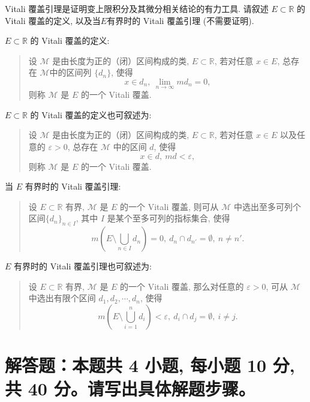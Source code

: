 \begin{question}[points = 10]
  Vitali 覆盖引理是证明变上限积分及其微分相关结论的有力工具. 请叙述 $E\subset \mathbb{R}$ 的 Vitali 覆盖的定义, 以及当$E$有界时的 Vitali 覆盖引理 (不需要证明).
\end{question}

\begin{solution}
  \(E\subset \mathbb{R}\) 的 Vitali 覆盖的定义: 

  \begin{quote}
  设 \(\mathscr{M}\) 是由长度为正的（闭）区间构成的类, \(E \subset \mathbb{R}\), 若对任意 \(x \in E\), 总存在 \(\mathscr{M}\)中的区间列 \(\{d_n\}\), 使得
  \[x \in d_n, ~ \lim\limits_{n\to\infty} m d_n = 0,\]
  则称 \(\mathscr{M}\) 是 \(E\) 的一个 Vitali 覆盖.
  \end{quote}

  \(E\subset \mathbb{R}\) 的 Vitali 覆盖的定义也可叙述为:

  \begin{quote}
  设 \(\mathscr{M}\) 是由长度为正的（闭）区间构成的类, \(E \subset \mathbb{R}\), 若对任意 \(x \in E\) 以及任意的 \(\varepsilon > 0\), 总存在 \(\mathscr{M}\) 中的区间 \(d\), 使得
  \[x \in d, ~ m d < \varepsilon,\]
  则称 \(\mathscr{M}\) 是 \(E\) 的一个 Vitali 覆盖.
  \end{quote}

  当 \(E\) 有界时的 Vitali 覆盖引理: 

  \begin{quote}
  设 \(E \subset \mathbb{R}\) 有界, \(\mathscr{M}\) 是 \(E\) 的一个 Vitali 覆盖, 则可从 \(\mathscr{M}\) 中选出至多可列个区间\(\{d_n\}_{n \in I}\), 其中 \(I\) 是某个至多可列的指标集合, 使得
  \[m \left( E \setminus \bigcup\limits_{n \in I} d_n \right) = 0, ~ d_n \cap d_{n'} = \emptyset, ~ n \neq n'.\]
  \end{quote}

  \(E\) 有界时的 Vitali 覆盖引理也可叙述为:

  \begin{quote}
  设 \(E \subset \mathbb{R}\) 有界, \(\mathscr{M}\) 是 \(E\) 的一个 Vitali 覆盖, 那么对任意的 \(\varepsilon > 0\), 可从 \(\mathscr{M}\) 中选出有限个区间 \(d_1, d_2, \cdots, d_n\), 使得
  \[m \left( E \setminus \bigcup\limits_{i=1}^n d_i \right) < \varepsilon, ~ d_i \cap d_j = \emptyset, ~ i \neq j.\]
  \end{quote}
\end{solution}


\section{解答题：本题共 4 小题, 每小题 10 分, 共 40 分。请写出具体解题步骤。}

